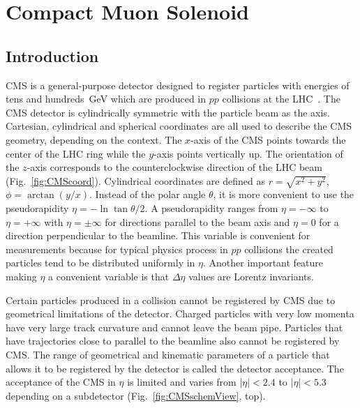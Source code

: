 \section{Compact Muon Solenoid}
\label{sec:Exp_CMS}
\subsection{Introduction}



CMS is a general-purpose detector designed to register particles with energies of tens and hundreds~GeV which are produced in $pp$ collisions at the LHC~\cite{ref_CMS_TDR}. The CMS detector is cylindrically symmetric with the particle beam as the axis. Cartesian, cylindrical and spherical coordinates are all used to describe the CMS geometry, depending on the context. The $x$-axis of the CMS points towards the center of the LHC ring while the $y$-axis points vertically up. The orientation of the $z$-axis corresponds to the counterclockwise direction of the LHC beam (Fig.~\ref{fig:CMScoord}). Cylindrical coordinates are defined as $r=\sqrt{x^2+y^2}$, $\phi=\arctan(y/x)$. Instead of the polar angle $\theta$, it is more convenient to use the pseudorapidity $\eta=-\ln{\tan{\theta/2}}$. A pseudorapidity ranges from $\eta=-\infty$ to $\eta=+\infty$ with $\eta=\pm \infty$ for directions parallel to the beam axis and $\eta=0$ for a direction perpendicular to the beamline. This variable is convenient for measurements because for typical physics process in $pp$ collisions the created particles tend to be distributed uniformly in $\eta$. Another important feature making $\eta$ a convenient variable is that $\Delta \eta$ values are Lorentz invariants.

Certain particles produced in a collision cannot be registered by CMS due to geometrical limitations of the detector. Charged particles with very low momenta have very large track curvature and cannot leave the beam pipe. Particles that have trajectories close to parallel to the beamline also cannot be registered by CMS. The range of geometrical and kinematic parameters of a particle that allows it to be registered by the detector is called the detector acceptance. The acceptance of the CMS in $\eta$ is limited and varies from $|\eta|<2.4$ to $|\eta|<5.3$ depending on a subdetector (Fig.~\ref{fig:CMSschemView}, top).   


